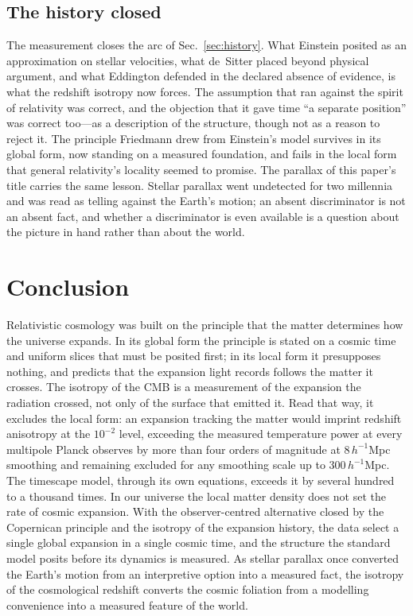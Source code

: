 \documentclass[aps,prd,reprint,amsmath,amssymb,superscriptaddress]{revtex4-2}
\begin{document}
\subsection{The history closed}

The measurement closes the arc of Sec.~\ref{sec:history}. What Einstein posited as an approximation on stellar velocities, what de~Sitter placed beyond physical argument, and what Eddington defended in the declared absence of evidence, is what the redshift isotropy now forces. The assumption that ran against the spirit of relativity was correct, and the objection that it gave time ``a separate position'' was correct too---as a description of the structure, though not as a reason to reject it. The principle Friedmann drew from Einstein's model survives in its global form, now standing on a measured foundation, and fails in the local form that general relativity's locality seemed to promise. The parallax of this paper's title carries the same lesson. Stellar parallax went undetected for two millennia and was read as telling against the Earth's motion; an absent discriminator is not an absent fact, and whether a discriminator is even available is a question about the picture in hand rather than about the world.

\section{Conclusion}\label{sec:conclusion}

Relativistic cosmology was built on the principle that the matter determines how the universe expands. In its global form the principle is stated on a cosmic time and uniform slices that must be posited first; in its local form it presupposes nothing, and predicts that the expansion light records follows the matter it crosses. The isotropy of the CMB is a measurement of the expansion the radiation crossed, not only of the surface that emitted it. Read that way, it excludes the local form: an expansion tracking the matter would imprint redshift anisotropy at the $10^{-2}$ level, exceeding the measured temperature power at every multipole Planck observes by more than four orders of magnitude at $8\,h^{-1}$Mpc smoothing and remaining excluded for any smoothing scale up to $300\,h^{-1}$Mpc. The timescape model, through its own equations, exceeds it by several hundred to a thousand times. In our universe the local matter density does not set the rate of cosmic expansion. With the observer-centred alternative closed by the Copernican principle and the isotropy of the expansion history, the data select a single global expansion in a single cosmic time, and the structure the standard model posits before its dynamics is measured. As stellar parallax once converted the Earth's motion from an interpretive option into a measured fact, the isotropy of the cosmological redshift converts the cosmic foliation from a modelling convenience into a measured feature of the world.
\end{document}

